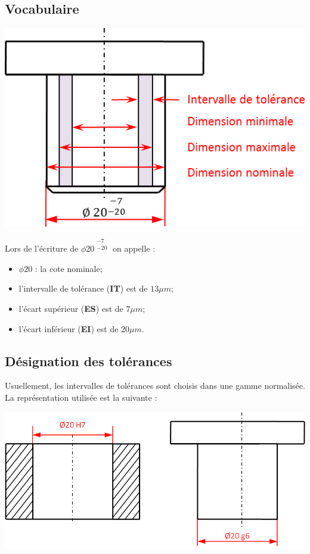 \documentclass[11pt,oneside]{article}
\begin{document}
\subsection{Vocabulaire}

\begin{center}
\includegraphics[width=.6\textwidth]{png/voca}
\end{center}


\begin{defi}
Lors de l'écriture de $\phi 20^{\begin{array}{c}-7 \\ -20 \end{array}}$ on appelle : 
\begin{itemize}
\item $\phi 20$ : la cote nominale;
\item l'intervalle de tolérance (\textbf{IT}) est de $13\mu m$;
\item l'écart supérieur (\textbf{ES}) est de $7\mu m$;
\item l'écart inférieur (\textbf{EI}) est de $20\mu m$.
\end{itemize}
\end{defi}

\subsection{Désignation des tolérances}
Usuellement, les intervalles de tolérances sont choisis dans une gamme normalisée. 
La représentation utilisée est la suivante : 
\begin{center}
\includegraphics[width=.8\textwidth]{png/fig2.png}
\end{center}
\end{document}
